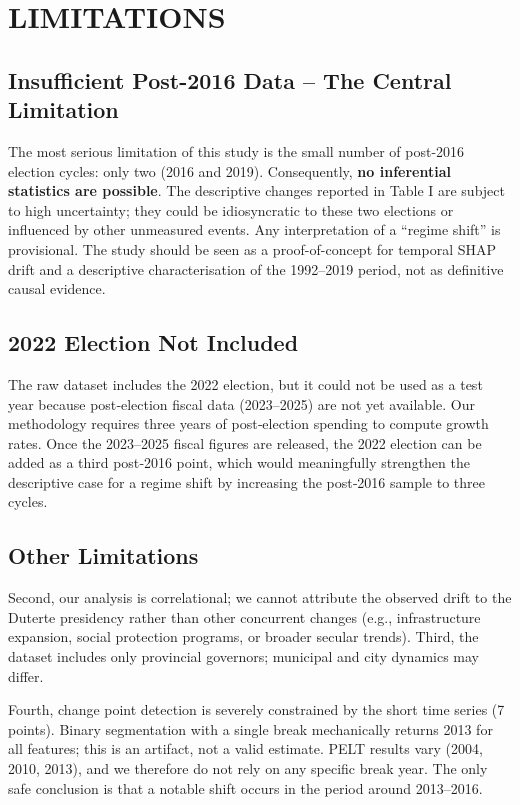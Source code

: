 \documentclass[conference]{IEEEtran}
\begin{document}
\section{LIMITATIONS}

\subsection{Insufficient Post-2016 Data – The Central Limitation}
The most serious limitation of this study is the small number of post-2016 election cycles: only two (2016 and 2019). Consequently, \textbf{no inferential statistics are possible}. The descriptive changes reported in Table I are subject to high uncertainty; they could be idiosyncratic to these two elections or influenced by other unmeasured events. Any interpretation of a “regime shift” is provisional. The study should be seen as a proof-of-concept for temporal SHAP drift and a descriptive characterisation of the 1992–2019 period, not as definitive causal evidence.

\subsection{2022 Election Not Included}
The raw dataset includes the 2022 election, but it could not be used as a test year because post‑election fiscal data (2023–2025) are not yet available. Our methodology requires three years of post‑election spending to compute growth rates. Once the 2023–2025 fiscal figures are released, the 2022 election can be added as a third post‑2016 point, which would meaningfully strengthen the descriptive case for a regime shift by increasing the post‑2016 sample to three cycles.

\subsection{Other Limitations}
Second, our analysis is correlational; we cannot attribute the observed drift to the Duterte presidency rather than other concurrent changes (e.g., infrastructure expansion, social protection programs, or broader secular trends). Third, the dataset includes only provincial governors; municipal and city dynamics may differ. 

Fourth, change point detection is severely constrained by the short time series (7 points). Binary segmentation with a single break mechanically returns 2013 for all features; this is an artifact, not a valid estimate. PELT results vary (2004, 2010, 2013), and we therefore do not rely on any specific break year. The only safe conclusion is that a notable shift occurs in the period around 2013–2016.
\end{document}

